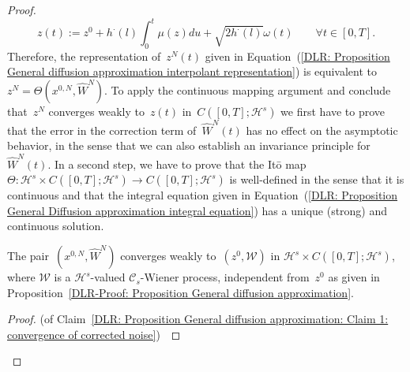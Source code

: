 \begin{proof}
  \begin{equation}
    \label{DLR: Proposition General Diffusion approximation integral equation}
   z(t) := z^0 + h^{\cdot}(l) \int_0^t \mu(z) du + \sqrt{2 h^{\cdot}(l)} \omega(t) \qquad \forall t \in [0,T].
  \end{equation}
  Therefore, the representation of~$z^N(t)$ given in Equation~(\ref{DLR: Proposition General diffusion approximation interpolant representation}) is equivalent to~$z^N = \Theta (x^{0,N}, \widehat{W}^N )$. To apply the continuous mapping argument and conclude that~$z^N $ converges weakly to~$ z(t)$ in~$ C([0,T]; \mathcal{H}^s)$ we first have to prove that the error in the correction term of~$\widehat{W}^N(t)$ has no effect on the asymptotic behavior, in the sense that we can also establish an invariance principle for~$\widehat{W}^N(t)$. In a second step, we have to prove that the It\={o} map~$\Theta : \mathcal{H}^s \times C([0,T]; \mathcal{H}^s) \to  C([0,T]; \mathcal{H}^s)$ is well-defined in the sense that it is continuous and that the integral equation given in Equation~(\ref{DLR: Proposition General Diffusion approximation integral equation}) has a unique (strong) and continuous solution.
  
  \begin{claim}
   \label{DLR: Proposition General diffusion approximation: Claim 1: convergence of corrected noise}
   The pair~$(x^{0,N}, \widehat{W}^N)$ converges weakly to~$(z^0, \mathcal{W})$ in $\mathcal{H}^s \times C([0,T]; \mathcal{H}^s)$, where $\mathcal{W}$ is a $\mathcal{H}^s$-valued $\mathcal{C}_s$-Wiener process, independent from~$z^0$ as given in Proposition~\ref{DLR-Proof: Proposition General diffusion approximation}.
  \end{claim}
  \begin{proof}(of Claim~\ref{DLR: Proposition General diffusion approximation: Claim 1: convergence of corrected noise})~\autocite[Proposition 3.1]{Pillai2012}
    

\end{proof}
\end{proof}
